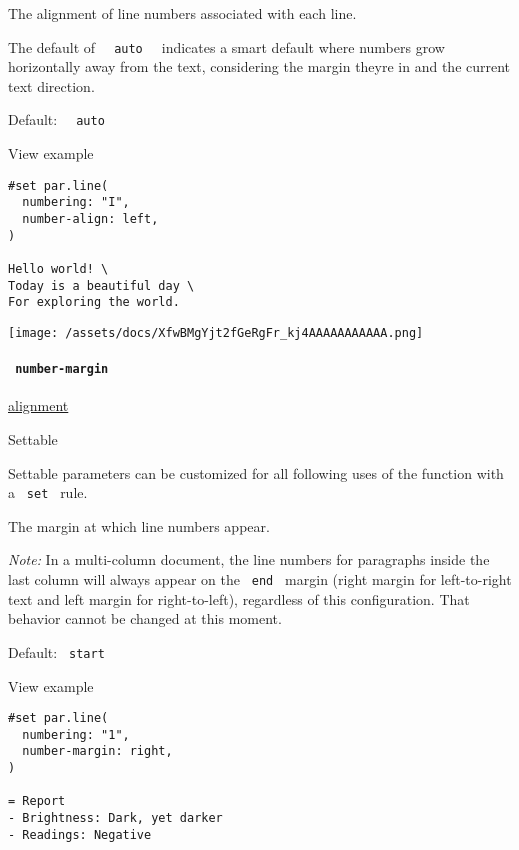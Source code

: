 The alignment of line numbers associated with each line.

The default of \texttt{\ }{\texttt{\ auto\ }}\texttt{\ } indicates a
smart default where numbers grow horizontally away from the text,
considering the margin they\textquotesingle re in and the current text
direction.

Default: \texttt{\ }{\texttt{\ auto\ }}\texttt{\ }


View example

\begin{verbatim}
#set par.line(
  numbering: "I",
  number-align: left,
)

Hello world! \
Today is a beautiful day \
For exploring the world.
\end{verbatim}

\texttt{[image: /assets/docs/XfwBMgYjt2fGeRgFr\_kj4AAAAAAAAAAA.png]}

\paragraph{\texorpdfstring{\texttt{\ number-margin\ }}{ number-margin }}\label{definitions-line-number-margin}

\href{/docs/reference/layout/alignment/}{alignment}

{{ Settable }}

\label{definitions-line-number-margin-settable-tooltip}
Settable parameters can be customized for all following uses of the
function with a \texttt{\ set\ } rule.

The margin at which line numbers appear.

\emph{Note:} In a multi-column document, the line numbers for paragraphs
inside the last column will always appear on the \texttt{\ end\ } margin
(right margin for left-to-right text and left margin for right-to-left),
regardless of this configuration. That behavior cannot be changed at
this moment.

Default: \texttt{\ start\ }


View example

\begin{verbatim}
#set par.line(
  numbering: "1",
  number-margin: right,
)

= Report
- Brightness: Dark, yet darker
- Readings: Negative
\end{verbatim}


